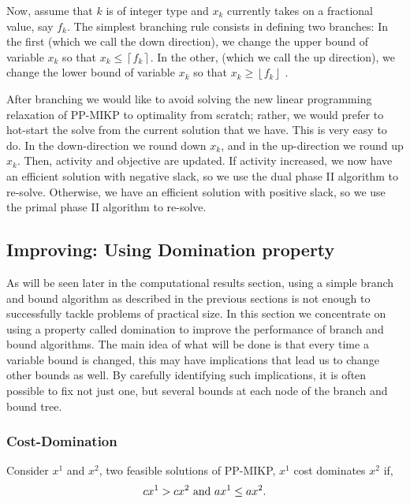 \documentclass[a4paper,11pt]{article}
\begin{document}
Now, assume that $k$ is of integer type and $x_k$ currently takes on a fractional value, say $f_k$. The simplest branching rule consists in defining two branches: In the first (which we call the down direction), we change the upper bound of variable $x_k$ so that $x_k ≤ \left \lceil{f_k}\right \rceil $. In the other, (which we call the up direction), we change the lower bound of variable $x_k$ so that $x_k ≥\left \lfloor{f_k}\right \rfloor$ .

After branching we would like to avoid solving the new linear programming relaxation of PP-MIKP to optimality from scratch; rather, we would prefer to hot-start the solve from the current solution that we have. This is very easy to do. In the down-direction we round down $x_k$, and in the up-direction we round up $x_k$. Then, activity and objective are updated. If activity increased, we now have an efficient solution with negative slack, so we use the dual phase II algorithm to re-solve. Otherwise, we have an efficient solution with positive slack, so we use the primal phase II algorithm to re-solve.





\subsection{Improving: Using Domination property}

As will be seen later in the computational results section, using a simple branch and bound algorithm as described in the previous sections is not enough to successfully tackle problems of practical size. In this section we concentrate on using a property called domination to improve the performance of branch and bound algorithms. The main idea of what will be done is that every time a variable bound is changed, this may have implications that lead us to change other bounds as well. By carefully identifying such implications, it is often possible to fix not just one, but several bounds at each node of the branch and bound tree.

\subsubsection{Cost-Domination}

\begin{definition}
Consider $x^1$ and $x^2$, two feasible solutions of PP-MIKP, $x^1$ cost dominates $x^2$ if,
\begin{equation}
cx^1>cx^2 ~\mbox{and}~ ax^1\leq ax^2.
\end{equation}
\end{definition}
\end{document}
